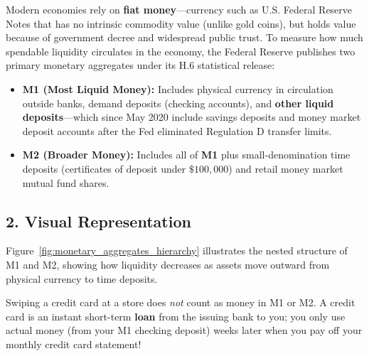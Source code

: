 \documentclass[11pt,letterpaper]{article}
\begin{document}
Modern economies rely on \textbf{fiat money}—currency such as U.S. Federal Reserve Notes that has no intrinsic commodity value (unlike gold coins), but holds value because of government decree and widespread public trust. To measure how much spendable liquidity circulates in the economy, the Federal Reserve publishes two primary monetary aggregates under its H.6 statistical release:
\begin{itemize}
    \item \textbf{M1 (Most Liquid Money):} Includes physical currency in circulation outside banks, demand deposits (checking accounts), and \textbf{other liquid deposits}—which since May 2020 include savings deposits and money market deposit accounts after the Fed eliminated Regulation D transfer limits.
    \item \textbf{M2 (Broader Money):} Includes all of \textbf{M1} plus small-denomination time deposits (certificates of deposit under $\$100{,}000$) and retail money market mutual fund shares.
\end{itemize}

\subsection*{2. Visual Representation}
Figure~\ref{fig:monetary_aggregates_hierarchy} illustrates the nested structure of M1 and M2, showing how liquidity decreases as assets move outward from physical currency to time deposits.

\begin{tcolorbox}[colback=yellow!10!white,colframe=orange!80!black,title=\textbf{Clear It Up: Credit Cards Are Not Money!}]
Swiping a credit card at a store does \emph{not} count as money in M1 or M2. A credit card is an instant short-term \textbf{loan} from the issuing bank to you; you only use actual money (from your M1 checking deposit) weeks later when you pay off your monthly credit card statement!
\end{tcolorbox}
\end{document}
